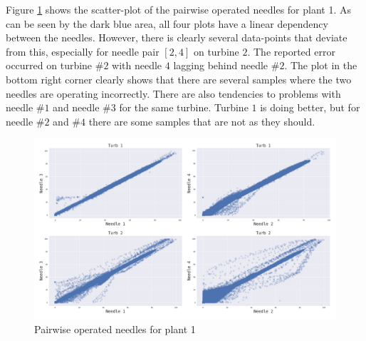         
         Figure \ref{fig:plant1_needles} shows the scatter-plot of the pairwise operated needles for plant 1. As can be seen by the dark blue area, all four plots have a linear dependency between the needles. However, there is clearly several data-points that deviate from this, especially for needle pair $[2,4]$ on turbine $2$. The reported error occurred on turbine #$2$ with needle $4$ lagging behind needle #$2$. The plot in the bottom right corner clearly shows that there are several samples where the two needles are operating incorrectly. There are also tendencies to problems with needle #$1$ and needle #$3$ for the same turbine. Turbine $1$ is doing better, but for needle #$2$ and #$4$ there are some samples that are not as they should. 
        
        \begin{figure}[h]
            \centering
            \includegraphics[width=\textwidth]{report/figures/data/plant1_needles.png}
            \caption{Pairwise operated needles for plant 1}
            \label{fig:plant1_needles}
        \end{figure}
        
